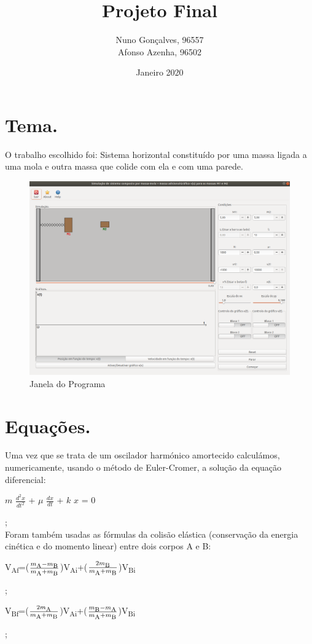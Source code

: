 \documentclass{article}
\title{Projeto Final}
\author{Nuno Gonçalves, 96557\\
Afonso Azenha, 96502}
\date{Janeiro 2020}
\begin{document}
\maketitle

\section{Tema.}
O trabalho escolhido foi: Sistema horizontal constituído por uma massa ligada a uma mola e outra massa que colide com ela e com uma parede.

\begin{figure}[h!]
\centering
\includegraphics[scale=0.30]{FINAL.png}
\caption{Janela do Programa}
\label{fig:Programa}
\end{figure}

\section{Equações.}
Uma vez que se trata de um oscilador harmónico amortecido calculámos, numericamente, usando  o  método  de Euler-Cromer, a solução da equação diferencial: 
\centerline{$m$ $\frac{d^2x}{dt^2}$ + $\mu$ $\frac{dx}{dt}$ + $k$ ${x}$ = 0};\\
Foram também usadas as fórmulas da colisão elástica (conservação da energia cinética e do momento linear) entre dois corpos A e B:\\
\centerline{V\textsubscript{Af}=($\frac{m\textsubscript{A}-m\textsubscript{B}}{m\textsubscript{A}+m\textsubscript{B}}$)V\textsubscript{Ai}+($\frac{2m\textsubscript{B}}{m\textsubscript{A}+m\textsubscript{B}}$)V\textsubscript{Bi}};\\
\centerline{V\textsubscript{Bf}=($\frac{2m\textsubscript{A}}{m\textsubscript{A}+m\textsubscript{B}}$)V\textsubscript{Ai}+($\frac{m\textsubscript{B}-m\textsubscript{A}}{m\textsubscript{A}+m\textsubscript{B}}$)V\textsubscript{Bi}};\\
\end{document}
